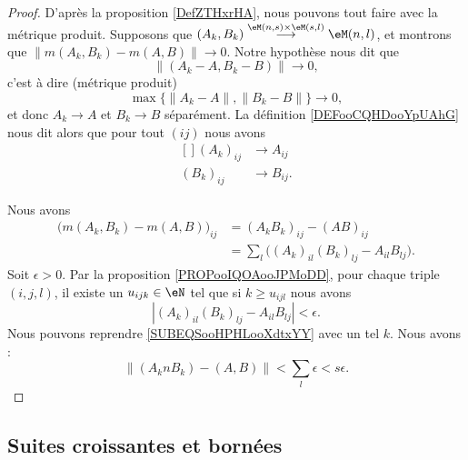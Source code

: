 \begin{proof}
	D'après la proposition \ref{DefZTHxrHA}, nous pouvons tout faire avec la métrique produit. Supposons que \( (A_k,B_k)  \stackrel{ \eM(n,s)\times \eM(s,l) }{\longrightarrow} \eM(n,l) \), et montrons que \( \| m(A_k,B_k)-m(A,B) \|\to 0\). Notre hypothèse nous dit que
	\begin{equation}
		\| (A_k-A,B_k-B) \|\to 0,
	\end{equation}
	c'est à dire (métrique produit)
	\begin{equation}
		\max\big\{  \| A_k-A \|,\| B_k-B \| \big\}\to 0,
	\end{equation}
	et donc \( A_k\to A\) et \( B_k\to B\) séparément. La définition \ref{DEFooCQHDooYpUAhG} nous dit alors que pour tout \( (ij)\) nous avons
	\begin{equation}
		\begin{aligned}[]
			(A_k)_{ij} & \to A_{ij}  \\
			(B_k)_{ij} & \to B_{ij}.
		\end{aligned}
	\end{equation}

	Nous avons
	\begin{subequations}		\label{SUBEQSooHPHLooXdtxYY}
		\begin{align}
			\Big( m(A_k,B_k)-m(A,B) \Big)_{ij} & =(A_kB_k)_{ij}-(AB)_{ij}                               \\
			                                   & = \sum_l\Big( (A_k)_{il}(B_k)_{lj}-A_{il}B_{lj} \Big).
		\end{align}
	\end{subequations}
	Soit \( \epsilon>0\). Par la proposition \ref{PROPooIQOAooJPMoDD}, pour chaque triple \( (i,j,l)\), il existe un \( u_{ijk}\in \eN\) tel que si \( k\geq u_{ijl}\) nous avons
	\begin{equation}
		| (A_k)_{il}(B_k)_{lj}-A_{il}B_{lj} |<\epsilon.
	\end{equation}
	Nous pouvons reprendre \eqref{SUBEQSooHPHLooXdtxYY} avec un tel \( k\). Nous avons :
	\begin{equation}
		\| (A_knB_k)-(A,B) \|<\sum_l\epsilon<s\epsilon.
	\end{equation}
\end{proof}

\subsection{Suites croissantes et bornées}

